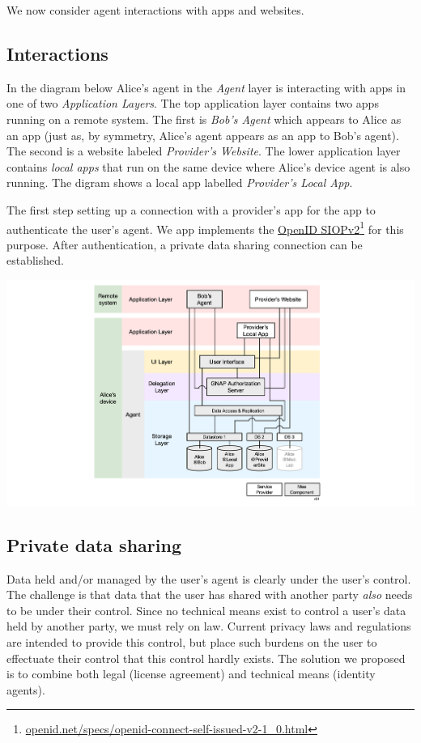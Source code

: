 \documentclass[11pt, oneside]{article}   	%
\newcommand{\hyperfootnote}[1][]{\def\ArgI{{#1}}\hyperfootnoteRelay}
\newcommand\hyperfootnoteRelay[2][]{\href{#1#2}{\ArgI}\footnote{\href{#1#2}{#2}}}
\begin{document}
We now consider agent interactions with apps and websites. 

\subsection{Interactions}

In the diagram below Alice's agent in the \emph{Agent} layer is interacting with apps in one of two \emph{Application Layers}. The top application layer contains two apps running on a remote system. The first is \emph{Bob's Agent} which appears to Alice as an app (just as, by symmetry, Alice's agent appears as an app to Bob's agent). The second is a website labeled \emph{Provider's Website}. The lower application layer contains \emph{local apps} that run on the same device where Alice's device agent is also running. The digram shows a local app labelled \emph{Provider's Local App}.

The first step setting up a connection with a provider's app for the app to authenticate the user's agent. We app implements the \hyperfootnote[OpenID SIOPv2][https://]{openid.net/specs/openid-connect-self-issued-v2-1\_0.html} for this purpose. After authentication, a private data sharing connection can be established.

\includegraphics[width=\textwidth]{./images/applications.png}

\subsection{Private data sharing}

Data held and/or managed by the user's agent is clearly under the user's control. The challenge is that data that the user has shared with another party \emph{also} needs to be under their control. Since no technical means exist to control a user's data held by another party, we must rely on law. Current privacy laws and regulations are intended to provide this control, but place such burdens on the user to effectuate their control that this control hardly exists. The solution we proposed is to combine both legal (license agreement) and technical means (identity agents). 
\end{document}
